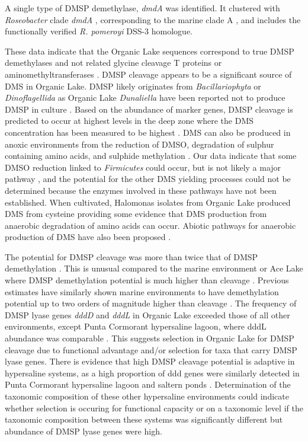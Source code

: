 A single type of \ac{DMSP} demethylase, \emph{dmdA} was identified. 
It clustered with \emph{Roseobacter} clade \emph{dmdA} , corresponding to the marine clade A \cite{Howard2006}, and includes the functionally verified \emph{R. pomeroyi} DSS-3 homologue. 

These data indicate that the Organic Lake sequences correspond to true \ac{DMSP} demethylases and not related glycine cleavage T proteins or aminomethyltransferases \cite{Howard2006}. 
\ac{DMSP} cleavage appears to be a significant source of \ac{DMS} in Organic Lake. 
\ac{DMSP} likely originates from \emph{Bacillariophyta} or \emph{Dinoflagellida} as Organic Lake \emph{Dunaliella} have been reported not to produce \ac{DMSP} in culture \cite{Franzmann1987b}. 
Based on the abundance of marker genes, \ac{DMSP} cleavage is predicted to occur at highest levels in the deep zone  where the \ac{DMS} concentration has been measured to be highest \cite{Deprez1986, Franzmann1987b, Gibson1991, Roberts1993a, Roberts1993b}. 
\ac{DMS} can also be produced in anoxic environments from the reduction of \ac{DMSO}, degradation of sulphur containing amino acids, and sulphide methylation \cite{Schafer2010}. 
Our data indicate that some \ac{DMSO} reduction linked to \emph{Firmicutes} could occur, but is not likely a major pathway , and the potential for the other \ac{DMS} yielding processes could not be determined because the enzymes involved in these pathways have not been established. 
When cultivated, Halomonas isolates from Organic Lake produced \ac{DMS} from cysteine \cite{Franzmann1987b} providing some evidence that \ac{DMS} production from anaerobic degradation of amino acids can occur. 
Abiotic pathways for anaerobic production of \ac{DMS} have also been proposed \cite{Roberts1993b}.

The potential for \ac{DMSP} cleavage was more than twice that of \ac{DMSP} demethylation . 
This is unusual compared to the marine environment or Ace Lake where \ac{DMSP} demethylation potential is much higher than cleavage . 
Previous estimates have similarly shown marine environments to have demethylation potential up to two orders of magnitude higher than cleavage \cite{Howard2008, Todd2009, Todd2011, Reisch2011b}. 
The frequency of \ac{DMSP} lyase genes \emph{dddD} and \emph{dddL} in Organic Lake exceeded those of all other environments, except Punta Cormorant hypersaline lagoon, where dddL abundance was comparable . 
This suggests selection in Organic Lake for \ac{DMSP} cleavage due to functional advantage and/or selection for taxa that carry \ac{DMSP} lyase genes. 
There is evidence that high \ac{DMSP} cleavage potential is adaptive in hypersaline systems, as a high proportion of ddd genes were similarly detected in Punta Cormorant hypersaline lagoon and saltern ponds \cite{Raina2010}. Determination of the taxonomic composition of these other hypersaline environments could indicate whether selection is occuring for functional capacity or on a taxonomic level if the taxonomic composition between these systems was significantly different but abundance of DMSP lyase genes were high.

